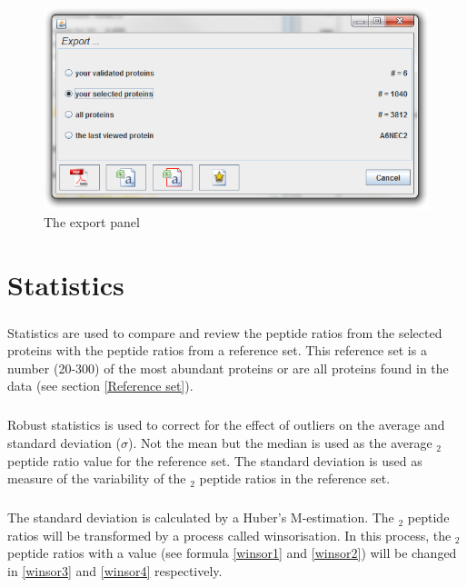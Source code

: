 \documentclass[11pt,a4paper,oneside,notitlepage]{book}
\begin{document}
\begin{figure}[H]
\begin{center}
\includegraphics[scale=0.4]{save_panel.png}
\caption{The export panel}
\label{export panel}
\end{center}
\end{figure}


\chapter{Statistics}\label{Statistics}

\paragraph{}Statistics are used to compare and review the peptide ratios from the selected proteins with the peptide ratios from a reference set. This reference set is a number (20-300) of the most abundant proteins or are all proteins found in the data (see section \ref{Reference set}).

\paragraph{}Robust statistics is used to correct for the effect of outliers on the average and standard deviation ($\sigma$). Not the mean but the median is used as the average \log $_{2}$ peptide ratio value for the reference set. The standard deviation is used as measure of the variability of the \log $_{2}$ peptide ratios in the reference set.

\paragraph{}The standard deviation is calculated by a Huber's M-estimation. The \log $_{2}$ peptide ratios will be transformed by a process called winsorisation. In this process, the \log $_{2}$ peptide ratios with a value (see formula \ref{winsor1} and \ref{winsor2}) will be changed in \ref{winsor3} and \ref{winsor4} respectively.
\end{document}
